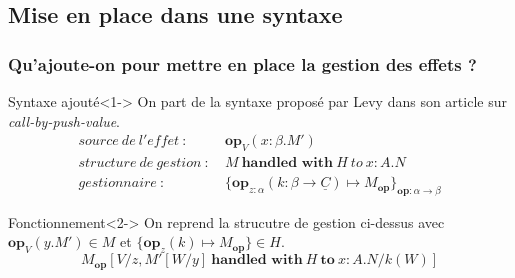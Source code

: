 \documentclass{beamer}
\begin{document}
\subsection{Mise en place dans une syntaxe}
\begin{frame}[fragile]
	\frametitle{Qu'ajoute-on pour mettre en place la gestion des effets ?}
	\begin{block}{Syntaxe ajouté}<1->
		On part de la syntaxe proposé par Levy dans son article sur \textit{call-by-push-value}.
		\begin{align*}
			source~de~l'effet~:~&\textbf{op}_V(x:\beta.M')\\
			structure~de~gestion~:~&M~\textbf{handled~with}~H~to~x:A.N\\
			gestionnaire~:~&\{\textbf{op}_{z:\alpha}(k:\beta \rightarrow \underline{C}) \mapsto M_{\textbf{op}}\}_{\textbf{op} : \alpha \rightarrow \beta}
		\end{align*}
	\end{block}

	\begin{block}{Fonctionnement}<2->
		On reprend la strucutre de gestion ci-dessus 
		avec $\textbf{op}_V(y.M') \in M$ et $\{\textbf{op}_z(k) \mapsto M_ {\textbf{op}}\} \in H$.
			\alert{\[M_{\textbf{op}}[V/z,M'[W/y]~\textbf{handled~with}~H~\textbf{to}~x:A.N/k(W)]\]}
	\end{block}
\end{frame}
\end{document}
